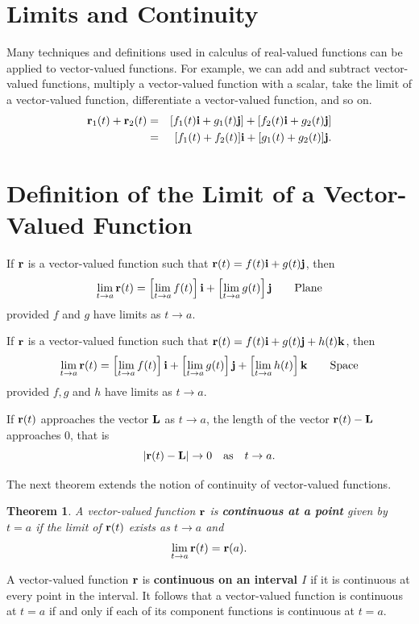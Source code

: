 \documentclass[titlepage,a4paper,12pt]{report}
\newtheorem{theorem}{Theorem}[section]
\begin{document}
\section{Limits and Continuity}
Many techniques and definitions used in calculus of real-valued functions can be applied to vector-valued functions. For example, we can add and subtract vector-valued functions, multiply a vector-valued function with a scalar, take the limit of a vector-valued function, differentiate a vector-valued function, and so on.
\begin{eqnarray*}
{\bf{r}}_1(t) + {\bf{r}}_2(t) &=& [f_1(t){\bf{i}}+g_1(t){\bf{j}}] +[f_2(t){\bf{i}}+g_2(t){\bf{j}}] \\
&=& [f_1(t)+f_2(t)] {\bf{i}} + [g_1(t)+g_2(t)] {\bf{j}}.
\end{eqnarray*}
\section{Definition of the Limit of a Vector-Valued Function }
If ${\bf{r}}$ is a vector-valued function such that ${\bf{r}}(t) = f(t){\bf{i}}+g(t){\bf{j}}$, then 
\[\lim _{t\rightarrow a} {{\bf{r}}(t)} =\left[ \lim _{t\rightarrow a}{f(t)}\right]{\bf{i}} +\left[ \lim _{t\rightarrow a}{g(t)}\right]{\bf{j}} \quad \quad \mbox{Plane}\] provided $f$ and $g$ have limits as $t\rightarrow a$.

\noindent If ${\bf{r}}$ is a vector-valued function such that ${\bf{r}}(t)=f(t){\bf{i}}+g(t){\bf{j}}+h(t){\bf{k}}$, then 
\[\lim _{t\rightarrow a} {{\bf{r}}(t)} =\left[ \lim _{t\rightarrow a}{f(t)}\right]{\bf{i}} +\left[ \lim _{t\rightarrow a}{g(t)}\right]{\bf{j}} +\left[ \lim _{t\rightarrow a}{h(t)}\right]{\bf{k}} \quad \quad \mbox{Space}\] provided $f,g$ and $h$ have limits as $t\rightarrow a$.

\noindent If ${\bf{r}}(t)$ approaches the vector ${\bf{L}}$ as $t\rightarrow a$, the length of the vector ${\bf{r}}(t)-{\bf{L}}$ approaches $0$, that is 
 \[|{\bf{r}}(t)-{\bf{L}}|\rightarrow 0 \quad  \mbox{as} \quad t\rightarrow a.\]
 
\noindent The next theorem extends the notion of continuity of vector-valued functions.
\begin{theorem}
A vector-valued function ${\bf{r}}$ is \textbf{continuous at a point} given by $t=a$ if the limit of ${\bf{r}}(t)$ exists as $t\rightarrow a$ and 
\[\lim _{t\rightarrow a} {\bf{r}}(t)={\bf{r}}(a).\]
\end{theorem}
\noindent A vector-valued function ${\bf{r}}$ is \textbf{continuous on an interval $I$} if it is continuous at every point in the interval. It follows that a vector-valued function is continuous at $t=a$ if and only if each of its component functions is continuous at $t=a$.
\end{document}
